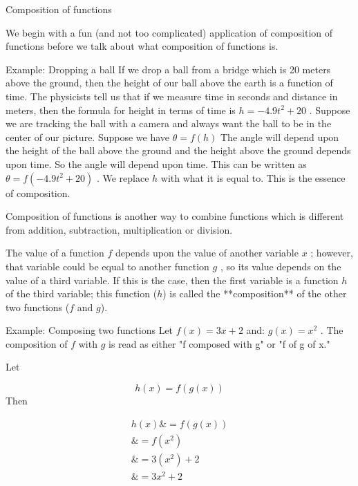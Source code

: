 Composition of functions



We begin with a fun (and not too complicated) application of composition of functions
before we talk about what composition of functions is.



Example: Dropping a ball If we drop a ball from a bridge which is 20 meters above the
ground, then the height of our ball above the earth is a function of time. The physicists
tell us that if we measure time in seconds and distance in meters, then the formula for
height in terms of time is $h=-4.9t^2+20$ . Suppose we are tracking the ball with a camera
and always want the ball to be in the center of our picture. Suppose we have $\theta=f(h)$
The angle will depend upon the height of the ball above the ground and the height above
the ground depends upon time. So the angle will depend upon time. This can be written as
$\theta=f(-4.9t^2+20)$ . We replace $h$ with what it is equal to. This is the essence of
composition.



Composition of functions is another way to combine functions which is different from
addition, subtraction, multiplication or division.



The value of a function $f$ depends upon the value of another variable $x$ ; however, that
variable could be equal to another function $g$ , so its value depends on the value of a
third variable. If this is the case, then the first variable is a function $h$ of the
third variable; this function ($h$) is called the **composition** of the other two
functions ($f$ and $g$).



Example: Composing two functions Let $f(x)=3x+2$ and: $g(x)=x^2$ . The composition of $f$
with $g$ is read as either "f composed with g" or "f of g of x."



Let



$$h(x)=f(g(x))$$ Then



\begin{align}
h(x) \& = f(g(x)) \\
     \& = f(x^2) \\
     \& = 3(x^2)+2 \\
     \& = 3x^2+2 \,
\end{align}



